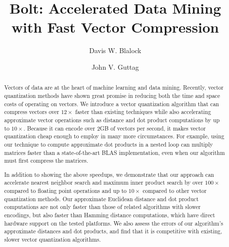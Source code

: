 \documentclass[sigconf]{acmart}  %
\begin{document}

  

\fancyhead{}  %

\title{Bolt: Accelerated Data Mining with Fast Vector Compression}

\author{Davis W. Blalock}

\author{John V. Guttag}

\begin{abstract}

Vectors of data are at the heart of machine learning and data mining. Recently, vector quantization methods have shown great promise in reducing both the time and space costs of operating on vectors. We introduce a vector quantization algorithm that can compress vectors over $12\times$ faster than existing techniques while also accelerating approximate vector operations such as distance and dot product computations by up to $10\times$. Because it can encode over 2GB of vectors per second, it makes vector quantization cheap enough to employ in many more circumstances. For example, using our technique to compute approximate dot products in a nested loop can multiply matrices faster than a state-of-the-art BLAS implementation, even when our algorithm must first compress the matrices.

In addition to showing the above speedups, we demonstrate that our approach can accelerate nearest neighbor search and maximum inner product search by over $100\times$ compared to floating point operations and up to $10\times$ compared to other vector quantization methods. Our approximate Euclidean distance and dot product computations are not only faster than those of related algorithms with slower encodings, but also faster than Hamming distance computations, which have direct hardware support on the tested platforms. We also assess the errors of our algorithm's approximate distances and dot products, and find that it is competitive with existing, slower vector quantization algorithms. %

\end{abstract}
\end{document}
